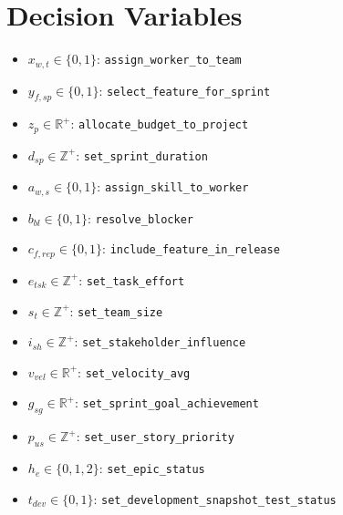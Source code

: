 \documentclass{article}
\begin{document}
\section{Decision Variables}
\begin{itemize}
    \item $x_{w,t} \in \{0,1\}$: \texttt{assign\_worker\_to\_team}
    \item $y_{f,sp} \in \{0,1\}$: \texttt{select\_feature\_for\_sprint}
    \item $z_p \in \mathbb{R}^+$: \texttt{allocate\_budget\_to\_project}
    \item $d_{sp} \in \mathbb{Z}^+$: \texttt{set\_sprint\_duration}
    \item $a_{w,s} \in \{0,1\}$: \texttt{assign\_skill\_to\_worker}
    \item $b_{bl} \in \{0,1\}$: \texttt{resolve\_blocker}
    \item $c_{f,rep} \in \{0,1\}$: \texttt{include\_feature\_in\_release}
    \item $e_{tsk} \in \mathbb{Z}^+$: \texttt{set\_task\_effort}
    \item $s_t \in \mathbb{Z}^+$: \texttt{set\_team\_size}
    \item $i_{sh} \in \mathbb{Z}^+$: \texttt{set\_stakeholder\_influence}
    \item $v_{vel} \in \mathbb{R}^+$: \texttt{set\_velocity\_avg}
    \item $g_{sg} \in \mathbb{R}^+$: \texttt{set\_sprint\_goal\_achievement}
    \item $p_{us} \in \mathbb{Z}^+$: \texttt{set\_user\_story\_priority}
    \item $h_e \in \{0,1,2\}$: \texttt{set\_epic\_status}
    \item $t_{dev} \in \{0,1\}$: \texttt{set\_development\_snapshot\_test\_status}
\end{itemize}
\end{document}

